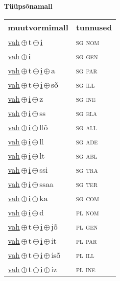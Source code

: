 

\vspace{3.5em}
\noindent \begin{minipage}{\textwidth}
\noindent \textbf{Tüüpsõnamall \,}\\

\begin{sideways}
\begin{tabular}{l l}
muutvormimall & tunnused \\
\hline
\underline{vah}\,$\oplus$\,t\,$\oplus$\,\underline{i} & \textsc{ sg nom } \\
\underline{vah}\,$\oplus$\,\underline{i} & \textsc{ sg gen } \\
\underline{vah}\,$\oplus$\,t\,$\oplus$\,\underline{i}\,$\oplus$\,a & \textsc{ sg par } \\
\underline{vah}\,$\oplus$\,t\,$\oplus$\,\underline{i}\,$\oplus$\,sõ & \textsc{ sg ill } \\
\underline{vah}\,$\oplus$\,\underline{i}\,$\oplus$\,z & \textsc{ sg ine } \\
\underline{vah}\,$\oplus$\,\underline{i}\,$\oplus$\,ss & \textsc{ sg ela } \\
\underline{vah}\,$\oplus$\,\underline{i}\,$\oplus$\,llõ & \textsc{ sg all } \\
\underline{vah}\,$\oplus$\,\underline{i}\,$\oplus$\,ll & \textsc{ sg ade } \\
\underline{vah}\,$\oplus$\,\underline{i}\,$\oplus$\,lt & \textsc{ sg abl } \\
\underline{vah}\,$\oplus$\,\underline{i}\,$\oplus$\,ssi & \textsc{ sg tra } \\
\underline{vah}\,$\oplus$\,\underline{i}\,$\oplus$\,ssaa & \textsc{ sg ter } \\
\underline{vah}\,$\oplus$\,\underline{i}\,$\oplus$\,ka & \textsc{ sg com } \\
\underline{vah}\,$\oplus$\,\underline{i}\,$\oplus$\,d & \textsc{ pl nom } \\
\underline{vah}\,$\oplus$\,t\,$\oplus$\,\underline{i}\,$\oplus$\,jõ & \textsc{ pl gen } \\
\underline{vah}\,$\oplus$\,t\,$\oplus$\,\underline{i}\,$\oplus$\,it & \textsc{ pl par } \\
\underline{vah}\,$\oplus$\,t\,$\oplus$\,\underline{i}\,$\oplus$\,isõ & \textsc{ pl ill } \\
\underline{vah}\,$\oplus$\,t\,$\oplus$\,\underline{i}\,$\oplus$\,iz & \textsc{ pl ine } \\

\end{tabular}
\end{sideways}
\end{minipage}
